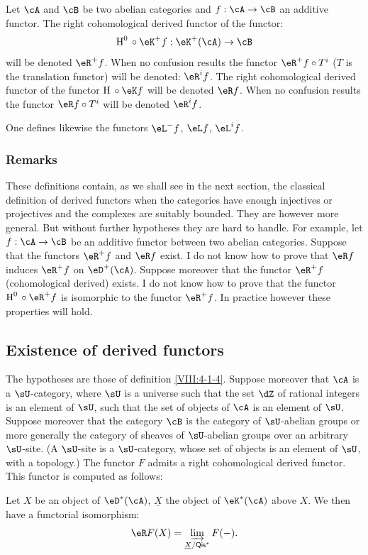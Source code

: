 Let $\cA$ and $\cB$ be two abelian categories and $f:\cA\to \cB$ an
additive functor. The right cohomological derived functor of the functor:
\[
  \h^0{}\circ \eK^+ f:\eK^+(\cA) \to \cB
\]
will be denoted $\eR^+ f$. When no confusion results the functor
$\eR^+ f\circ T^i$ ($T$ is the translation functor) will be denoted:
$\eR^i f$. The right cohomological derived functor of the functor
$\h{}\circ \eK f$ will be denoted $\eR f$. When no confusion results
the functor $\eR f\circ T^i$ will be denoted $\eR^i f$.

One defines likewise the functors $\eL^- f$, $\eL f$, $\eL^i f$. 





\subsubsection{Remarks}\label{VIII:4-1-6}

These definitions contain, as we shall see in the next
section, the classical definition of derived functors when the
categories have enough injectives or projectives and the complexes
are suitably bounded. They are however more general. But
without further hypotheses they are hard to handle. For example, let
$f:\cA\to \cB$ be an additive functor between two abelian categories.
Suppose that the functors $\eR^+ f$ and $\eR f$ exist. I do not know how to
prove that $\eR f$ induces $\eR^+ f$ on $\eD^+(\cA)$. Suppose
moreover that the functor $\eR^+ f$ (cohomological derived) exists. I do not know
how to prove that the functor $\h^0{}\circ \eR^+ f$ is isomorphic to the functor
$\eR^+ f$. In practice however these properties will hold. 










\subsection{Existence of derived functors}\label{VIII:4-2}





\begin{proposition}\label{VIII:4-2-1}
The hypotheses are those of definition \ref{VIII:4-1-4}. Suppose
moreover that $\cA$ is a $\sU$-category, where $\sU$ is a universe such
that the set $\dZ$ of rational integers is an element of $\sU$, such
that the set of objects of $\cA$ is an element of $\sU$. Suppose
moreover that the category $\cB$ is the category of $\sU$-abelian
groups or more generally the category of sheaves of
$\sU$-abelian groups over an arbitrary $\sU$-site. (A $\sU$-site is a
$\sU$-category, whose set of objects is an element of $\sU$,
with a topology.) The functor $F$ admits a right
cohomological derived functor. This functor is computed as follows:

Let $X$ be an object of $\eD^\ast(\cA)$, $\underline X$ the object of
$\eK^\ast(\cA)$ above $X$. We then have a functorial isomorphism:
\[
  \eR F(X) = \varinjlim_{\underline X/\mathsf{Qis}^\ast} F(-) \text{.}
\]
\end{proposition}

